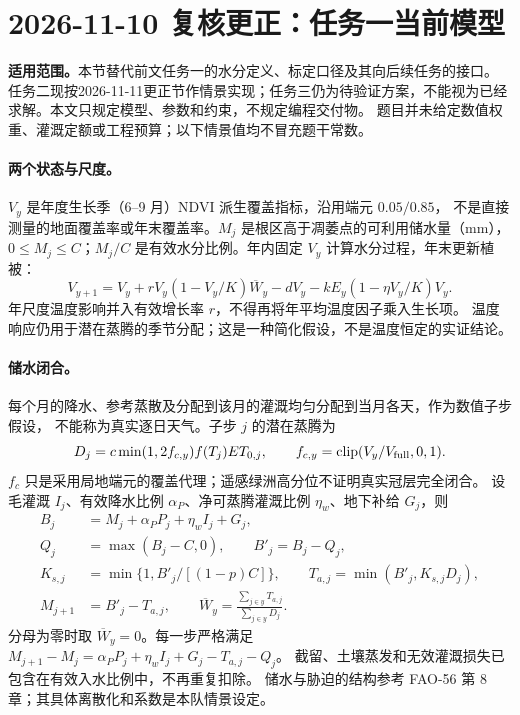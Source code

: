 \clearpage
\section*{2026-11-10 复核更正：任务一当前模型}
\textbf{适用范围。}本节替代前文任务一的水分定义、标定口径及其向后续任务的接口。
任务二现按2026-11-11更正节作情景实现；任务三仍为待验证方案，不能视为已经求解。本文只规定模型、参数和约束，不规定编程交付物。
题目并未给定数值权重、灌溉定额或工程预算；以下情景值均不冒充题干常数。

\paragraph{两个状态与尺度。}
$V_y$ 是年度生长季（6--9 月）NDVI 派生覆盖指标，沿用端元 $0.05/0.85$，
不是直接测量的地面覆盖率或年末覆盖率。$M_j$ 是根区高于凋萎点的可利用储水量（mm），
$0\le M_j\le C$；$M_j/C$ 是有效水分比例。年内固定 $V_y$ 计算水分过程，年末更新植被：
\[
 V_{y+1}=V_y+rV_y(1-V_y/K)\overline W_y-dV_y
             -kE_y(1-\eta V_y/K)V_y .
\]
年尺度温度影响并入有效增长率 $r$，不得再将年平均温度因子乘入生长项。
温度响应仍用于潜在蒸腾的季节分配；这是一种简化假设，不是温度恒定的实证结论。

\paragraph{储水闭合。}
每个月的降水、参考蒸散及分配到该月的灌溉均匀分配到当月各天，作为数值子步假设，
不能称为真实逐日天气。子步 $j$ 的潜在蒸腾为
\[
 D_j=c\min(1,2f_{c,y})f(T_j)ET_{0,j},\qquad
 f_{c,y}=\operatorname{clip}(V_y/V_{\rm full},0,1).
\]
$f_c$ 只是采用局地端元的覆盖代理；遥感绿洲高分位不证明真实冠层完全闭合。
设毛灌溉 $I_j$、有效降水比例 $\alpha_P$、净可蒸腾灌溉比例 $\eta_w$、地下补给 $G_j$，则
\begin{align*}
 B_j&=M_j+\alpha_PP_j+\eta_wI_j+G_j,\\
 Q_j&=\max(B_j-C,0),\qquad B'_j=B_j-Q_j,\\
 K_{s,j}&=\min\{1,B'_j/[(1-p)C]\},\qquad
 T_{a,j}=\min(B'_j,K_{s,j}D_j),\\
 M_{j+1}&=B'_j-T_{a,j},\qquad
 \overline W_y=\frac{\sum_{j\in y}T_{a,j}}{\sum_{j\in y}D_j}.
\end{align*}
分母为零时取 $\overline W_y=0$。每一步严格满足
$M_{j+1}-M_j=\alpha_PP_j+\eta_wI_j+G_j-T_{a,j}-Q_j$。
截留、土壤蒸发和无效灌溉损失已包含在有效入水比例中，不再重复扣除。
储水与胁迫的结构参考 FAO-56 第 8 章；其具体离散化和系数是本队情景设定。

